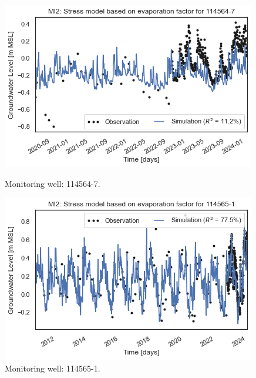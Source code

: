 \begin{figure}[htbp]
    \centering
    \begin{minipage}{0.32\textwidth}
        \centering
        \includegraphics[width=\linewidth]{frontmatter/Rozenburg-fig/1145647.png}
        \caption{Monitoring well: 114564-7.}
        \label{fig:114564-7}
    \end{minipage}
    \hfill
    \begin{minipage}{0.32\textwidth}
        \centering
        \includegraphics[width=\linewidth]{frontmatter/Rozenburg-fig/1145651(2).png}
        \caption{Monitoring well: 114565-1.}
        \label{fig:114565-1}
    \end{minipage}
    \hfill
\end{figure}\\
\newpage
\\
